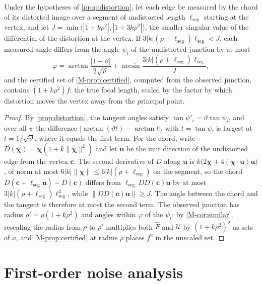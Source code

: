 \begin{corollary}\label{cor:chord}
Under the hypotheses of \cref{prop:distortion}, let each edge be measured by the chord of its distorted image over a segment of undistorted length $\ell_{\mathrm{seg}}$ starting at the vertex, and let $\underline J=\min\bigl(|1+k\rho^2|,|1+3k\rho^2|\bigr)$, the smaller singular value of the differential of the distortion at the vertex. If $3|k|(\rho+\ell_{\mathrm{seg}})\ell_{\mathrm{seg}}<\underline J$, each measured angle differs from the angle $\psi_i$ of the undistorted junction by at most
\[
\varphi=\arctan\frac{|1-\vartheta|}{2\sqrt\vartheta}+\arcsin\frac{3|k|(\rho+\ell_{\mathrm{seg}})\ell_{\mathrm{seg}}}{\underline J},
\]
and the certified set of \cref{M-prop:certified}, computed from the observed junction, contains $(1+k\rho^2)f$: the true focal length, scaled by the factor by which distortion moves the vertex away from the principal point.
\end{corollary}
\begin{proof}
By \cref{prop:distortion}, the tangent angles satisfy $\tan\psi'_i=\vartheta\tan\psi_i$, and over all $\psi$ the difference $|\arctan(\vartheta t)-\arctan t|$, with $t=\tan\psi$, is largest at $t=1/\sqrt\vartheta$, where it equals the first term. For the chord, write $D(\boldsymbol\chi)=\boldsymbol\chi(1+k\|\boldsymbol\chi\|^2)$ and let $\mathbf u$ be the unit direction of the undistorted edge from the vertex $\mathbf c$. The second derivative of $D$ along $\mathbf u$ is $k\bigl(2\boldsymbol\chi+4(\boldsymbol\chi\cdot\mathbf u)\mathbf u\bigr)$, of norm at most $6|k|\|\boldsymbol\chi\|\le6|k|(\rho+\ell_{\mathrm{seg}})$ on the segment, so the chord $D(\mathbf c+\ell_{\mathrm{seg}}\mathbf u)-D(\mathbf c)$ differs from $\ell_{\mathrm{seg}}\,DD(\mathbf c)\mathbf u$ by at most $3|k|(\rho+\ell_{\mathrm{seg}})\ell_{\mathrm{seg}}^2$, while $\|DD(\mathbf c)\mathbf u\|\ge\underline J$. The angle between the chord and the tangent is therefore at most the second term. The observed junction has radius $\rho'=\rho(1+k\rho^2)$ and angles within $\varphi$ of the $\psi_i$; by \cref{M-cor:similar}, rescaling the radius from $\rho$ to $\rho'$ multiplies both $\hat F$ and $\mathcal U$ by $(1+k\rho^2)^2$ as sets of $x$, and \cref{M-prop:certified} at radius $\rho$ places $f^2$ in the unscaled set.
\end{proof}



\section{First-order noise analysis}\label{sec:Snoise}

